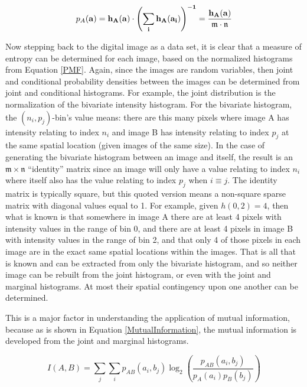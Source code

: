 \begin{equation}
\label{PMF}
	p_{A}(\bf{a})=h_{A}(\bf{a}) \cdot \left(\sum_{i}{h_{A}(a_{i})} \right)^{-1} = \frac{h_{A}(\bf{a})}{\mathfrak{m}\cdot\mathfrak{n}}
\end{equation}


Now stepping back to the digital image as a data set, it is clear that a measure of entropy can be determined for each image, based on the normalized histograms from Equation \ref{PMF}. Again, since the images are random variables, then joint and conditional probability densities between the images can be determined from joint and conditional histograms. For example, the joint distribution is the normalization of the bivariate intensity histogram. For the bivariate histogram, the $(n_{i},p_{j})${-}bin's value means: there are this many pixels where image A has intensity relating to index $n_{i}$ and image B has intensity relating to index $p_{j}$ at the same spatial location (given images of the same size). In the case of generating the bivariate histogram between an image and itself, the result is an $\mathfrak{m} \times \mathfrak{n}$ ``identity'' matrix since an image will only have a value relating to index $n_{i}$ where itself also has the value relating to index $p_{j}$ when $i \equiv j$. The identity matrix is typically square, but this quoted version means a non-square sparse matrix with diagonal values equal to 1. For example, given $h(0,2)=4$, then what is known is that somewhere in image A there are at least 4 pixels with intensity values in the range of bin 0, and there are at least 4 pixels in image B with intensity values in the range of bin 2, and that only 4 of those pixels in each image are in the exact same spatial locations within the images. That is all that is known and can be extracted from only the bivariate histogram, and so neither image can be rebuilt from the joint histogram, or even with the joint and marginal histograms. At most their spatial contingency upon one another can be determined.

This is a major factor in understanding the application of mutual information, because as is shown in Equation \ref{MutualInformation}, the mutual information is developed from the joint and marginal histograms.

\begin{equation}
\label{MutualInformation}
	I(A,B) = \sum_{j}{\sum_{i}{p_{AB}(a_{i},b_{j}) \log_{2}{\left( \frac{p_{AB}(a_{i},b_{j})}{p_{A}(a_{i})p_{B}(b_{j})}\right)}}}
\end{equation}

